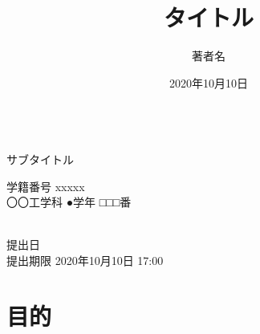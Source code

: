 \documentclass[a4paper]{ltjsarticle}
\title{タイトル}
\author{著者名}
\date{2020年10月10日}
\makeatletter
\newcommand{\@subtitle}{サブタイトル}
\newcommand{\@affiliation}{学籍番号 xxxxx \\ 〇〇工学科 ●学年 □□□番}
\newcommand{\@limit}{2020年10月10日 17:00}
\makeatother
\begin{document}
\begin{titlepage}
  \begin{center}
  \vspace*{120truept}
  {\huge \@title}\\ %
  \vspace{10truept}
  {\Large \@subtitle}\\ %
  \end{center}



  \vspace{120truept}

  \vspace{50truept}
  \begin{center}
    {\LARGE \@affiliation}\\
    \vspace{15truept}
    {\LARGE \@author}\\ %
  \end{center}

  \vspace{50truept}
  \begin{center}
    {\large 提出日 \@date}\\ %
    {\large 提出期限 \@limit}\\ %
  \end{center}
\end{titlepage}



\section{目的}
\end{document}
